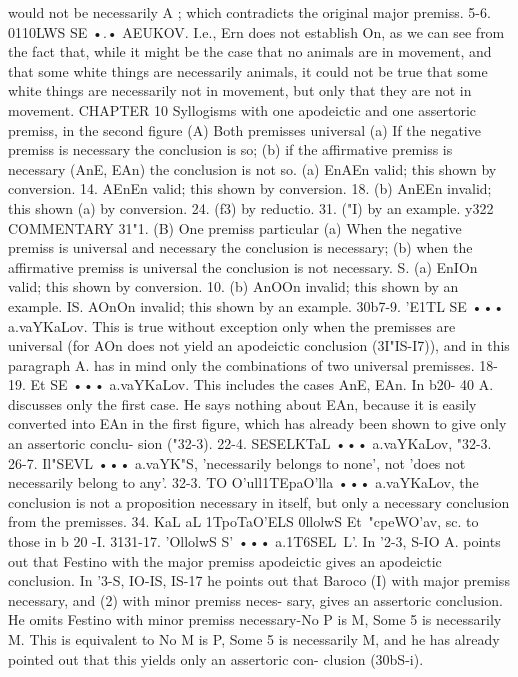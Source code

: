 {{would not be necessarily A ; which contradicts the original major
premiss.
5-6. 0110LWS SE •.• AEUKOV. I.e., Ern does not establish On,
as we can see from the fact that, while it might be the case that
no animals are in movement, and that some white things are
necessarily animals, it could not be true that some white things
are necessarily not in movement, but only that they are not in
movement.
CHAPTER 10
Syllogisms with one apodeictic and one assertoric premiss, in the
second figure
(A) Both premisses universal
(a) If the negative premiss is necessary the conclusion is so; (b)
if the affirmative premiss is necessary (AnE, EAn) the conclusion
is not so.
(a) EnAEn valid; this shown by conversion.
14. AEnEn valid; this shown by conversion.
18. (b) AnEEn invalid; this shown (a) by conversion.
24. (f3) by reductio.
31. ("I) by an example.
y322
COMMENTARY
31"1.
(B) One premiss particular
(a) When the negative premiss is universal and necessary the
conclusion is necessary; (b) when the affirmative premiss is
universal the conclusion is not necessary.
S. (a) EnIOn valid; this shown by conversion.
10. (b) AnOOn invalid; this shown by an example.
IS. AOnOn invalid; this shown by an example.
30b7-9. 'E1TL SE ••• a.vaYKaLov. This is true without exception
only when the premisses are universal (for AOn does not yield
an apodeictic conclusion (3I"IS-I7)), and in this paragraph A.
has in mind only the combinations of two universal premisses.
18-19. Et SE ••• a.vaYKaLov. This includes the cases AnE, EAn.
In b20- 40 A. discusses only the first case. He says nothing about
EAn, because it is easily converted into EAn in the first figure,
which has already been shown to give only an assertoric conclu-
sion ("32-3).
22-4. SESELKTaL ••• a.vaYKaLov, "32-3.
26-7. Il"SEVL ••• a.vaYK"S, 'necessarily belongs to none', not
'does not necessarily belong to any'.
32-3. TO O'ull1TEpaO'lla ••• a.vaYKaLov, the conclusion is not a
proposition necessary in itself, but only a necessary conclusion
from the premisses.
34. KaL aL 1TpoTaO'ELS 0llolwS Et~"cpeWO'av, sc. to those in b 20 -I.
3131-17. 'OllolwS S' ••• a.1T6SEL~L'. In '2-3, S-IO A. points out
that Festino with the major premiss apodeictic gives an apodeictic
conclusion. In '3-S, IO-IS, IS-17 he points out that Baroco (I)
with major premiss necessary, and (2) with minor premiss neces-
sary, gives an assertoric conclusion. He omits Festino with
minor premiss necessary-No P is M, Some 5 is necessarily M.
This is equivalent to No M is P, Some 5 is necessarily M, and he
has already pointed out that this yields only an assertoric con-
clusion (30bS-{i).
}}}
